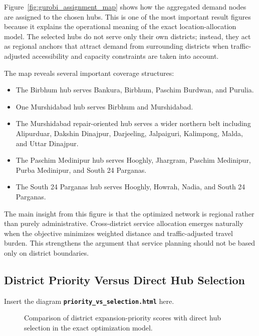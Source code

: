 Figure~\ref{fig:gurobi_assignment_map} shows how the aggregated demand nodes are assigned to the chosen hubs. This is one of the most important result figures because it explains the operational meaning of the exact location-allocation model. The selected hubs do not serve only their own districts; instead, they act as regional anchors that attract demand from surrounding districts when traffic-adjusted accessibility and capacity constraints are taken into account.

The map reveals several important coverage structures:
\begin{itemize}
    \item The Birbhum hub serves Bankura, Birbhum, Paschim Burdwan, and Purulia.
    \item One Murshidabad hub serves Birbhum and Murshidabad.
    \item The Murshidabad repair-oriented hub serves a wider northern belt including Alipurduar, Dakshin Dinajpur, Darjeeling, Jalpaiguri, Kalimpong, Malda, and Uttar Dinajpur.
    \item The Paschim Medinipur hub serves Hooghly, Jhargram, Paschim Medinipur, Purba Medinipur, and South 24 Parganas.
    \item The South 24 Parganas hub serves Hooghly, Howrah, Nadia, and South 24 Parganas.
\end{itemize}

The main insight from this figure is that the optimized network is regional rather than purely administrative. Cross-district service allocation emerges naturally when the objective minimizes weighted distance and traffic-adjusted travel burden. This strengthens the argument that service planning should not be based only on district boundaries.

\subsection{District Priority Versus Direct Hub Selection}

Insert the diagram \textbf{\texttt{priority\_vs\_selection.html}} here.

\begin{figure}[h!]
\centering
\caption{Comparison of district expansion-priority scores with direct hub selection in the exact optimization model.}
\label{fig:gurobi_priority_selection}
\end{figure}

